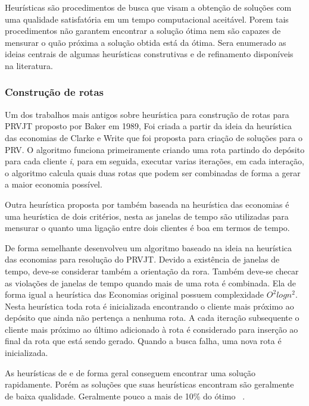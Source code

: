 Heurísticas são procedimentos de busca que visam a obtenção de soluções com uma qualidade satisfatória em um tempo computacional aceitável. Porem tais procedimentos não garantem encontrar a solução ótima nem são capazes de mensurar o quão próxima a solução obtida está da ótima. Sera enumerado as ideias centrais de algumas heurísticas construtivas e de refinamento disponíveis na literatura.

\subsubsection{Construção de rotas}

Um dos trabalhos mais antigos sobre heurística para construção de rotas para PRVJT proposto por Baker \cite{Baker} em 1989, Foi criada a partir da ideia da heurística das economias de Clarke e Write \cite{Clarke} que foi proposta para criação de soluções para o PRV. O algoritmo funciona primeiramente criando uma rota partindo do depósito para cada cliente \textit{i}, para em seguida, executar varias iterações, em cada interação, o algoritmo calcula quais duas rotas que podem ser combinadas de forma a gerar a maior economia possível.

Outra heurística proposta por \cite{VANLANDEGHEM} também baseada na heurística das economias é uma heurística de dois critérios, nesta as janelas de tempo são utilizadas para mensurar o quanto uma ligação entre dois clientes é boa em termos de tempo.

De forma semelhante \cite{Solomon} desenvolveu um algoritmo baseado na ideia na heurística das economias para resolução do PRVJT. Devido a existência de janelas de tempo, deve-se considerar também a orientação da rora. Também deve-se checar as violações de janelas de tempo quando mais de uma rota é combinada. Ela de forma igual a heurística das Economias original possuem complexidade \(O^2 log n^2\).
Nesta heurística toda rota é inicializada encontrando o cliente mais próximo ao depósito que ainda não pertença a nenhuma rota. A cada iteração subsequente o cliente mais próximo ao último adicionado à rota é considerado para inserção ao final da rota que está sendo gerado. Quando a busca falha, uma nova rota é inicializada.

As heurísticas de \cite{VANLANDEGHEM} e \cite{Solomon} de forma geral conseguem encontrar uma solução rapidamente. Porém as soluções que suas heurísticas encontram são geralmente de baixa qualidade. Geralmente pouco a mais de 10\% do ótimo ~\cite{Sherbeny}.

